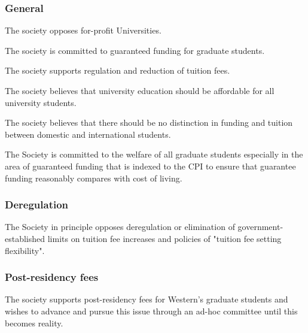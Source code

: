 \subsubsection{General
}
\begin{longenum}[ label*=\thesubsubsection.\arabic*., align=left]
\item 	The society opposes for-profit Universities. 
\item The society is committed to guaranteed funding for graduate students.
\item 	The society supports regulation and reduction of tuition fees.
\item The society believes that university education should be affordable for all university students.
\item The society believes that there should be no distinction in funding and tuition between domestic and international students.
\item The Society is committed to the welfare of all graduate students especially in the area of guaranteed funding that is indexed to the CPI to ensure that guarantee funding reasonably compares with cost of living.
\end{longenum}

\subsubsection{Deregulation}
\begin{longenum}[ label*=\thesubsubsection.\arabic*., align=left]
\item The Society in principle opposes deregulation or elimination of government-established limits on tuition fee increases and policies of "tuition fee setting flexibility". 
\end{longenum}
\subsubsection{Post-residency fees}
\begin{longenum}[ label*=\thesubsubsection.\arabic*., align=left]
\item	The society supports post-residency fees for Western's graduate students and wishes to advance and pursue this issue through an ad-hoc committee until this becomes reality. 
\end{longenum}
